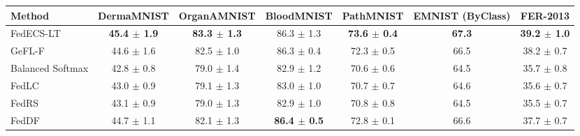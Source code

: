 \begin{tabular}{lcccccc}
\toprule
Method & DermaMNIST & OrganAMNIST & BloodMNIST & PathMNIST & EMNIST (ByClass) & FER-2013\\
\midrule
FedECS-LT & \textbf{45.4 $\pm$ 1.9} & \textbf{83.3 $\pm$ 1.3} & 86.3 $\pm$ 1.3 & \textbf{73.6 $\pm$ 0.4} & \textbf{67.3} & \textbf{39.2 $\pm$ 1.0}\\
GeFL-F & 44.6 $\pm$ 1.6 & 82.5 $\pm$ 1.0 & 86.3 $\pm$ 0.4 & 72.3 $\pm$ 0.5 & 66.5 & 38.2 $\pm$ 0.7\\
Balanced Softmax & 42.8 $\pm$ 0.8 & 79.0 $\pm$ 1.4 & 82.9 $\pm$ 1.2 & 70.6 $\pm$ 0.6 & 64.5 & 35.7 $\pm$ 0.8\\
FedLC & 43.0 $\pm$ 0.9 & 79.1 $\pm$ 1.3 & 83.0 $\pm$ 1.0 & 70.7 $\pm$ 0.7 & 64.6 & 35.6 $\pm$ 0.7\\
FedRS & 43.1 $\pm$ 0.9 & 79.0 $\pm$ 1.3 & 82.9 $\pm$ 1.0 & 70.8 $\pm$ 0.8 & 64.5 & 35.5 $\pm$ 0.7\\
FedDF & 44.7 $\pm$ 1.1 & 82.1 $\pm$ 1.3 & \textbf{86.4 $\pm$ 0.5} & 72.8 $\pm$ 0.1 & 66.6 & 37.7 $\pm$ 0.7\\
\bottomrule
\end{tabular}
